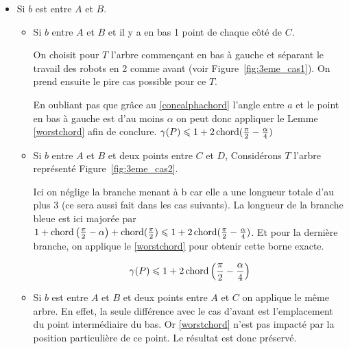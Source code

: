 \begin{itemize}

\item \label{3cas1} Si $b$ est entre $A$ et $B$.

\begin{itemize}

\item \label{3cas11} Si $b$ entre $A$ et $B$ et il y a en bas 1 point de chaque
  côté de $C$.

On choisit pour $T$ l'arbre commençant en bas à gauche et séparant le travail
des robots en 2 comme avant (voir Figure~\ref{fig:3eme_cas1}).
On prend ensuite le pire cas possible pour ce $T$.


En oubliant pas que grâce au \cref{conealphachord} l'angle entre $a$ et le point en bas à gauche est d'au moins $\alpha$ on peut donc appliquer le Lemme \ref{worstchord} afin de conclure.
$\gamma(P) \leqslant 1 + 2\operatorname{chord}(\frac{\pi}{2} - \frac{\alpha}{4})$

\item \label{3cas12} Si $b$ entre $A$ et $B$ et deux points entre $C$ et $D$,
	Considérons $T$ l'arbre représenté Figure~\ref{fig:3eme_cas2}.


Ici on néglige la branche menant à b car elle a une longueur totale d'au plus 3 (ce sera
aussi fait dans les cas suivants).
La longueur de la branche bleue est ici majorée par $1+\operatorname{chord}\left(\frac{\pi}{2} - \alpha\right)+\operatorname{chord}(\frac{\pi}{2}) \leqslant 1 + 2\operatorname{chord}(\frac{\pi}{2} - \frac{\alpha}{4})$.
Et pour la dernière branche, on applique le \cref{worstchord} pour obtenir
cette borne exacte.

$$\gamma(P) \leqslant 1 + 2\operatorname{chord}\left(\frac{\pi}{2} -
  \frac{\alpha}{4}\right)$$

\item \label{3cas13} Si $b$ est entre $A$ et $B$ et deux points entre $A$
  et $C$ on applique le même arbre. En effet, la seule différence avec le cas d'avant est l'emplacement du point intermédiaire du bas. Or \cref{worstchord} n'est pas impacté par la position particulière de ce point. Le résultat est donc préservé.
  

\end{itemize}
\end{itemize}
